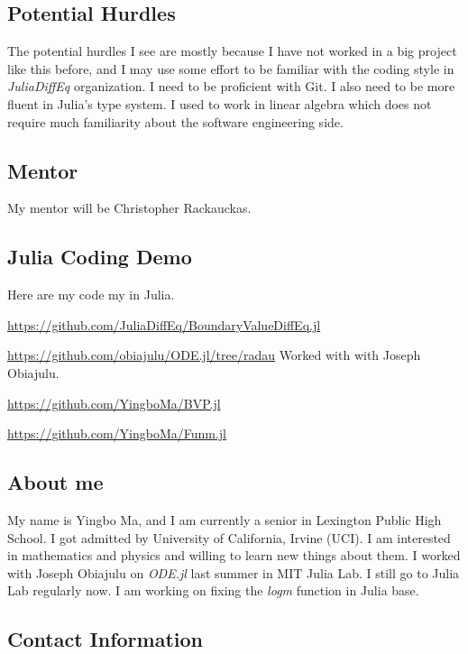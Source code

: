 \documentclass[a4paper,12pt,onecolumn]{article}
\begin{document}
\subsection{Potential Hurdles} %
\label{sub:potential_hurdles}
The potential hurdles I see are mostly because I have not worked in a big project like
this before, and I may use some effort to be familiar with the coding style in \textit{JuliaDiffEq}
organization. I need to be proficient with Git. I also need to be more fluent in Julia's
type system. I used to work in linear algebra which does not require much familiarity
about the software engineering side.

\subsection{Mentor} %
\label{sub:mentor}
My mentor will be Christopher Rackauckas.



\subsection{Julia Coding Demo} %
\label{ssub:julia_coding_demo}
Here are my code my in Julia.

\url{https://github.com/JuliaDiffEq/BoundaryValueDiffEq.jl}

\url{https://github.com/obiajulu/ODE.jl/tree/radau} Worked with with Joseph Obiajulu.

\url{https://github.com/YingboMa/BVP.jl}

\url{https://github.com/YingboMa/Funm.jl}

\subsection{About me} %
\label{ssub:about_me}
My name is Yingbo Ma, and I am currently a senior in Lexington Public High School. I got admitted by
University of California, Irvine (UCI). I am interested in mathematics and physics and willing to
learn new things about them. I worked with Joseph Obiajulu on \textit{ODE.jl} last summer in MIT
Julia Lab. I still go to Julia Lab regularly now. I am working on fixing the \textit{logm} function
in Julia base.

\subsection{Contact Information} %
\label{ssub:contact_information}
\end{document}
